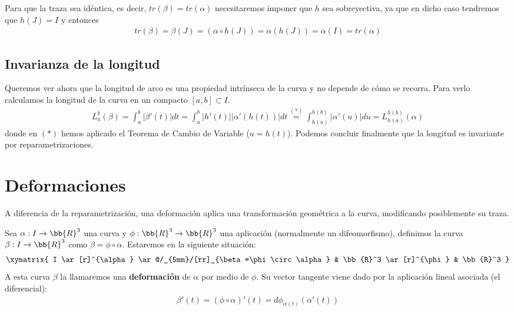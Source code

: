 \begin{observacion}
    Para que la traza sea idéntica, es decir, $tr(\beta) = tr(\alpha)$ necesitaremos imponer que $h$ sea sobreyectiva, ya que en dicho caso tendremos que $h(J)=I$ y entonces
    \begin{gather*}
        tr(\beta) = \beta(J) = (\alpha\circ h (J)) = \alpha(h(J)) = \alpha(I) = tr(\alpha)
    \end{gather*}
\end{observacion}

\subsection{Invarianza de la longitud}

Queremos ver ahora que la longitud de arco es una propiedad intrínseca de la curva y no depende de cómo se recorra. Para verlo calculamos la longitud de la curva en un compacto $[a,b]\subset I$.
\begin{gather*}
    L_a^b(\beta) = \int_a^b|\beta'(t)| dt = \int_a^b |h'(t)||\alpha'(h(t))| dt \overset{(\ast)}{=} \int_{h(a)}^{h(b)} |\alpha'(u)| du = L_{h(a)}^{h(b)}(\alpha)
\end{gather*}
donde en $(\ast)$ hemos aplicado el Teorema de Cambio de Variable ($u=h(t)$). Podemos concluir finalmente que la longitud es invariante por reparametrizaciones.

\section{Deformaciones}

A diferencia de la reparametrización, una deformación aplica una transformación geométrica a la curva, modificando posiblemente su traza.

\begin{definicion}
    Sea $\alpha: I \to \bb{R}^3$ una curva y $\phi:\bb{R}^3 \to \bb{R}^3$ una aplicación (normalmente un difeomorfismo), definimos la curva $\beta:I \to \bb{R}^3$ como $\beta = \phi \circ \alpha$. Estaremos en la siguiente situación:
    \begin{gather*}
        \xymatrix{
            I \ar[r]^{\alpha} \ar@/_{5mm}/[rr]_{\beta=\phi\circ \alpha} & \bb{R}^3 \ar[r]^{\phi} & \bb{R}^3
        }
    \end{gather*}
    A esta curva $\beta$ la llamaremos una \textbf{deformación} de $\alpha$ por medio de $\phi$. Su vector tangente viene dado por la aplicación lineal asociada (el diferencial):
    \begin{gather*}
        \beta'(t) = (\phi \circ \alpha)'(t) = d\phi_{\alpha(t)}(\alpha'(t))
    \end{gather*}
\end{definicion}

